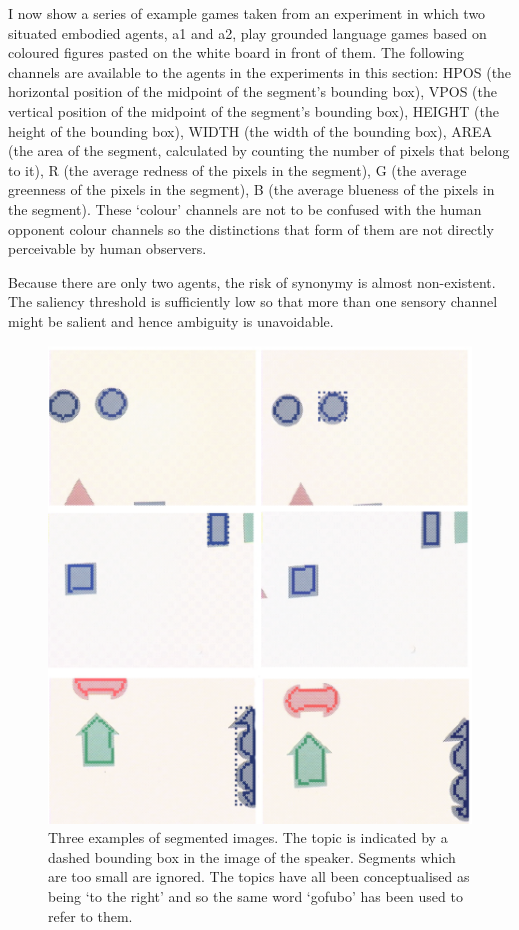 I now show a series of example games taken from 
an experiment in which two situated embodied agents,
{\bfshape a1} and {\bfshape a2}, play grounded language games based on 
coloured figures pasted on the white board in front
of them. The following channels are available to the agents 
in the experiments in this section: 
HPOS (the horizontal position of the midpoint 
of the segment's bounding box), 
VPOS (the vertical position of the midpoint of the segment's 
bounding box), HEIGHT (the height of the bounding box), 
WIDTH (the width of the bounding box), AREA
(the area of the segment, calculated
by counting the number of pixels that belong to it), 
R (the average redness of the pixels in the segment), 
G (the average greenness of the pixels in the segment), 
B (the average blueness of the pixels in the segment). 
These `colour' channels are not to be confused with the 
human opponent colour channels so the distinctions 
that form of them are not directly perceivable by 
human observers.

Because there are only two agents, the 
risk of synonymy is almost non-existent. The saliency 
threshold is sufficiently low so that more than one
sensory channel might be salient and hence ambiguity
is unavoidable. 

\begin{figure}
\begin{center}
\includegraphics[width=0.8\columnwidth]{chap7/figs/plate-10}
\end{center}
\caption{ \footnotesize Three examples of segmented images. The 
topic is indicated by a dashed bounding box in the 
image of the speaker. Segments which are too small 
are ignored. The topics have all been conceptualised
as being `to the right' and so the same word 
`gofubo' has been used to refer to them. }
\label{fig:plate-10}
\end{figure}

